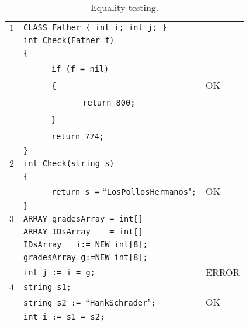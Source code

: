\documentclass{article}
\begin{document}
\begin{table}[h]
\centering
\begin{tabular}{|l|l|l|}
\hline
 $1$ & \verb"CLASS Father { int i; int j; }" &    \\
     & \verb"int Check(Father f)"            &    \\
     & \verb"{"                              &    \\
     & ~ ~ ~ ~\verb"if (f = nil)"           &    \\
     & ~ ~ ~ ~\verb"{"                       & OK \\
     & ~ ~ ~ ~ ~ ~ ~ ~\verb"return 800;"     &    \\
     & ~ ~ ~ ~\verb"}"                       &    \\
     & ~ ~ ~ ~\verb"return 774;"             &    \\
     & \verb"}"                              &    \\
\hline
 $2$ & \verb"int Check(string s)"                                   &    \\
     & \verb"{"                                                     &    \\
     & ~ ~ ~ ~\verb"return s =" ``\verb"LosPollosHermanos""\verb";" & OK \\
     & \verb"}"                                                     &    \\
\hline
 $3$ & \verb"ARRAY gradesArray = int[]"        &       \\
     & \verb"ARRAY IDsArray    = int[]"        &       \\
     & \verb"IDsArray   i:= NEW int[8];"       &       \\
     & \verb"gradesArray g:=NEW int[8];"       &       \\
     & \verb"int j := i = g;"                  & ERROR \\
\hline
 $4$ & \verb"string s1;"                                  &    \\
     & \verb"string s2 := "``\verb"HankSchrader""\verb";" & OK \\
     & \verb"int i := s1 = s2;"                           &    \\
\hline
\end{tabular}
\caption{Equality testing.
\label{Table_Code_Examples_Equality_Testing}}
\end{table}
\newpage
\end{document}
